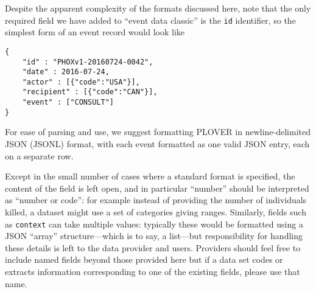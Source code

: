\documentclass[11pt]{report}
\begin{document}
Despite the apparent complexity of the formats discussed here, note that the only required field we have added to ``event data classic'' is the \texttt{id} identifier, so the simplest form of an event record would look like
\begin{verbatim}
{
	"id" : "PHOXv1-20160724-0042",
	"date" : 2016-07-24,
	"actor" : [{"code":"USA"}],
	"recipient" : [{"code":"CAN"}],
	"event" : ["CONSULT"]
}
\end{verbatim}

\noindent For ease of parsing and use, we suggest formatting PLOVER in newline-delimited JSON (JSONL) format, with each event formatted as one valid JSON entry, each on a separate row.

Except in the small number of cases where a standard format is specified, the content of the field is left open, and in particular ``number'' should be interpreted as ``number or code'': for example instead of providing the number of individuals killed, a dataset might use a set of categories giving ranges. Similarly, fields such as \texttt{context} can take multiple values: typically these would be formatted using a JSON ``array'' structure---which is to say, a list---but responsibility for handling these details is left to the data provider and users.  Providers should feel free to include named fields beyond those provided here but if a data set codes or extracts information  corresponding to one of the existing fields, please use that name.




\newpage
\end{document}
